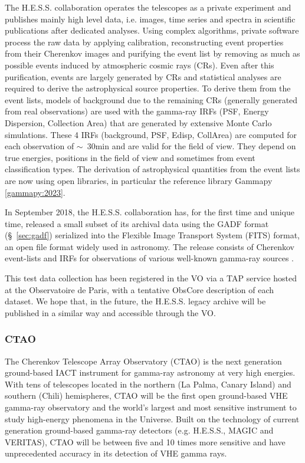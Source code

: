 \documentclass[11pt,a4paper]{ivoa}
\begin{document}
The H.E.S.S. collaboration operates the telescopes as a private experiment and publishes mainly high level data,
i.e. images, time series and spectra in scientific publications after dedicated analyses. Using complex algorithms,
private software process the raw data by applying calibration, reconstructing event properties from their Cherenkov
images and purifying the event list by removing as much as possible events induced by atmospheric cosmic rays (CRs). Even
after this purification, events are largely generated by CRs and statistical analyses are required to derive
the astrophysical source properties. To derive them from the event lists, models of background due to the remaining CRs
(generally generated from real observations) are used with the gamma-ray IRFs (PSF, Energy Dispersion, Collection Area)
that are generated by extensive Monte Carlo simulations. These 4 IRFs (background, PSF, Edisp, CollArea) are computed
for each observation of $\sim$~30min and are valid for the field of view. They depend on true energies, positions in the
field of view and sometimes from event classification types. The derivation of astrophysical quantities from
the event lists are now using open libraries, in particular the reference library Gammapy \ref{gammapy:2023}.

In September 2018, the H.E.S.S. collaboration has, for the first time and unique time, released a small subset of its
archival data using the GADF format (\S~\ref{sec:gadf}) serialized into the Flexible Image Transport System (FITS) format,
an open file format widely used in astronomy. The release consists of Cherenkov event-lists and IRFs for observations of
various well-known gamma-ray sources \citep{hess-zenodo.1421098}.

This test data collection has been registered in the VO via a TAP service hosted at the Observatoire de Paris, with a
tentative ObsCore description of each dataset. We hope that, in the future, the H.E.S.S. legacy archive will be published
in a similar way and accessible through the VO.

\subsubsection{CTAO}
\label{sec:ctao}

The Cherenkov Telescope Array Observatory (CTAO) is the next generation ground-based IACT instrument for gamma-ray astronomy
at very high energies. With tens of telescopes located in the northern (La Palma, Canary Island)
and southern (Chili) hemispheres, CTAO will be the  first open ground-based VHE gamma-ray observatory and the world’s
largest and most sensitive instrument to study  high-energy phenomena in the Universe. Built on the technology of current
generation ground-based gamma-ray detectors (e.g. H.E.S.S., MAGIC and VERITAS), CTAO will be between five and 10 times
more sensitive and have unprecedented accuracy  in its detection of VHE gamma rays.
\end{document}
